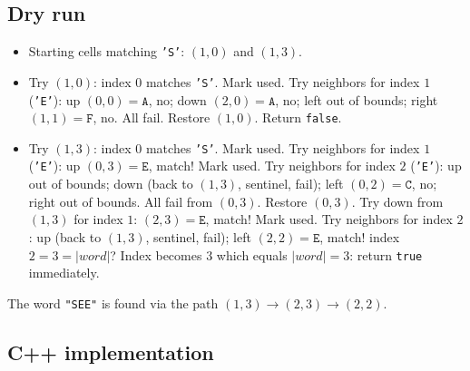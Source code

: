 \subsection*{Dry run}


\begin{itemize}
  \item Starting cells matching \texttt{'S'}: $(1,0)$ and $(1,3)$.
  \item Try $(1,0)$: index $0$ matches \texttt{'S'}. Mark used. Try
        neighbors for index $1$ (\texttt{'E'}): up $(0,0)=\texttt{A}$,
        no; down $(2,0)=\texttt{A}$, no; left out of bounds; right
        $(1,1)=\texttt{F}$, no. All fail. Restore $(1,0)$. Return
        \texttt{false}.
  \item Try $(1,3)$: index $0$ matches \texttt{'S'}. Mark used. Try
        neighbors for index $1$ (\texttt{'E'}): up $(0,3)=\texttt{E}$,
        match! Mark used. Try neighbors for index $2$ (\texttt{'E'}):
        up out of bounds; down (back to $(1,3)$, sentinel, fail); left
        $(0,2)=\texttt{C}$, no; right out of bounds. All fail from
        $(0,3)$. Restore $(0,3)$. Try down from $(1,3)$ for index $1$:
        $(2,3)=\texttt{E}$, match! Mark used. Try neighbors for index
        $2$: up (back to $(1,3)$, sentinel, fail); left
        $(2,2)=\texttt{E}$, match! index $2=3=|\textit{word}|$? Index
        becomes $3$ which equals $|\textit{word}|=3$: return
        \texttt{true} immediately.
  \end{itemize}

The word \texttt{"SEE"} is found via the path $(1,3) \to (2,3) \to
(2,2)$.

\subsection*{C++ implementation}

